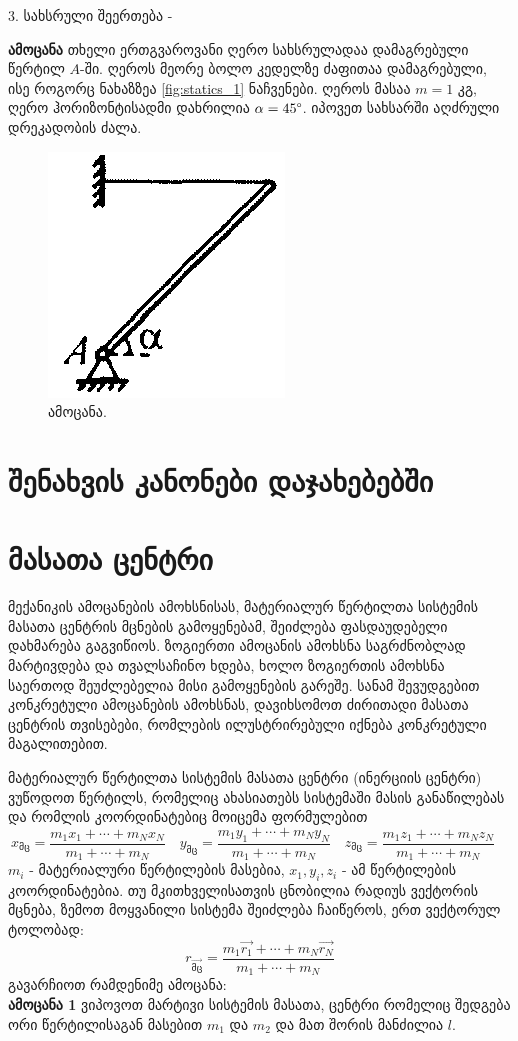 \documentclass{book}
\begin{document}
3. სახსრული შეერთება - 


\textbf{ამოცანა} თხელი ერთგვაროვანი ღერო სახსრულადაა დამაგრებული წერტილ $A$-ში. ღეროს მეორე ბოლო კედელზე ძაფითაა დამაგრებული, ისე როგორც ნახაზზეა \ref{fig:statics_1}  ნაჩვენები. ღეროს მასაა $m = 1$ კგ, ღერო ჰორიზონტისადმი დახრილია $\alpha = 45 \degree$. იპოვეთ სახსარში აღძრული დრეკადობის ძალა. 
	 	\begin{figure}[H]
	 	   \centering
           \includegraphics[width=0.2\columnwidth]{figures/statics_1}
           \caption{ამოცანა.}
        \end{figure}

\section{შენახვის კანონები დაჯახებებში}

\section{მასათა ცენტრი}
მექანიკის ამოცანების ამოხსნისას, მატერიალურ წერტილთა სისტემის მასათა ცენტრის მცნების გამოყენებამ, შეიძლება ფასდაუდებელი დახმარება გაგვიწიოს. ზოგიერთი ამოცანის ამოხსნა საგრძნობლად მარტივდება და თვალსაჩინო ხდება, ხოლო ზოგიერთის ამოხსნა საერთოდ შეუძლებელია მისი გამოყენების გარეშე. სანამ შევუდგებით კონკრეტული ამოცანების ამოხსნას, დავიხსომოთ ძირითადი მასათა ცენტრის თვისებები, რომლების ილუსტრირებული იქნება კონკრეტული მაგალითებით.

მატერიალურ წერტილთა სისტემის მასათა ცენტრი (ინერციის ცენტრი) ვუწოდოთ წერტილს, რომელიც ახასიათებს სისტემაში მასის განაწილებას და რომლის კოორდინატებიც მოიცემა ფორმულებით
	\begin{equation}
		x_{\text{მც}} = \frac{m_1x_1 + \dotsb + m_Nx_N}{m_1 + \dotsb + m_N} \quad
		y_{\text{მც}} = \frac{m_1y_1 + \dotsb + m_Ny_N}{m_1 + \dotsb + m_N} \quad
		z_{\text{მც}} = \frac{m_1z_1 + \dotsb + m_Nz_N}{m_1 + \dotsb + m_N} \quad
	\end{equation}
$m_i$ - მატერიალური წერტილების მასებია, $x_1,y_i,z_i$ - ამ წერტილების კოორდინატებია. თუ მკითხველისათვის ცნობილია რადიუს ვექტორის მცნება, ზემოთ მოყვანილი სისტემა შეიძლება ჩაიწეროს, ერთ ვექტორულ ტოლობად:
	\begin{equation}
		r_{\vec{\text{მც}}} = \frac{m_1\vec{r_1} + \dotsb + m_N\vec{r_N}}{m_1 + \dotsb + m_N}
	\end{equation}
გავარჩიოთ რამდენიმე ამოცანა:\\
\textbf{ამოცანა 1} ვიპოვოთ მარტივი სისტემის მასათა, ცენტრი რომელიც შედგება ორი წერტილისაგან მასებით $m_1$ და $m_2$ და მათ შორის მანძილია $l$.
\end{document}
